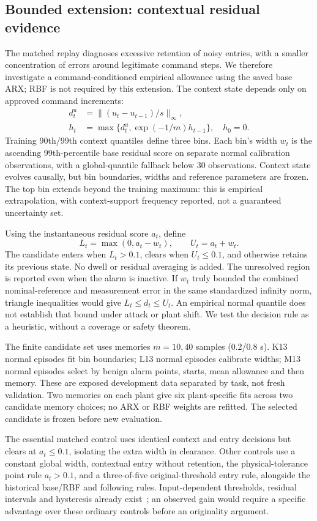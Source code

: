 \subsection{Bounded extension: contextual residual evidence}\label{sec:contextmethod}
The matched replay diagnoses excessive retention of noisy entries, with a smaller concentration of errors around legitimate command steps. We therefore investigate a command-conditioned empirical allowance using the saved base ARX; RBF is not required by this extension. The context state depends only on approved command increments:
\begin{align}
 d^u_t&=\|(u_t-u_{t-1})/s\|_\infty,\\
 h_t&=\max\{d^u_t,\exp(-1/m)h_{t-1}\},\quad h_0=0.
\end{align}
Training 90th/99th context quantiles define three bins. Each bin's width $w_t$ is the ascending 99th-percentile base residual score on separate normal calibration observations, with a global-quantile fallback below 30 observations. Context state evolves causally, but bin boundaries, widths and reference parameters are frozen. The top bin extends beyond the training maximum: this is empirical extrapolation, with context-support frequency reported, not a guaranteed uncertainty set.

Using the instantaneous residual score $a_t$, define
\begin{equation}
 L_t=\max(0,a_t-w_t),\qquad U_t=a_t+w_t.
\end{equation}
The candidate enters when $L_t>0.1$, clears when $U_t\le0.1$, and otherwise retains its previous state. No dwell or residual averaging is added. The unresolved region is reported even when the alarm is inactive. If $w_t$ truly bounded the combined nominal-reference and measurement error in the same standardized infinity norm, triangle inequalities would give $L_t\le d_t\le U_t$. An empirical normal quantile does not establish that bound under attack or plant shift. We test the decision rule as a heuristic, without a coverage or safety theorem.

The finite candidate set uses memories $m=10,40$ samples (0.2/0.8 s). K13 normal episodes fit bin boundaries; L13 normal episodes calibrate widths; M13 normal episodes select by benign alarm points, starts, mean allowance and then memory. These are exposed development data separated by task, not fresh validation. Two memories on each plant give six plant-specific fits across two candidate memory choices; no ARX or RBF weights are refitted. The selected candidate is frozen before new evaluation.

The essential matched control uses identical context and entry decisions but clears at $a_t\le0.1$, isolating the extra width in clearance. Other controls use a constant global width, contextual entry without retention, the physical-tolerance point rule $a_t>0.1$, and a three-of-five original-threshold entry rule, alongside the historical base/RBF and following rules. Input-dependent thresholds, residual intervals and hysteresis already exist~\cite{inputthreshold,motionconformal,interval}; an observed gain would require a specific advantage over these ordinary controls before an originality argument.
